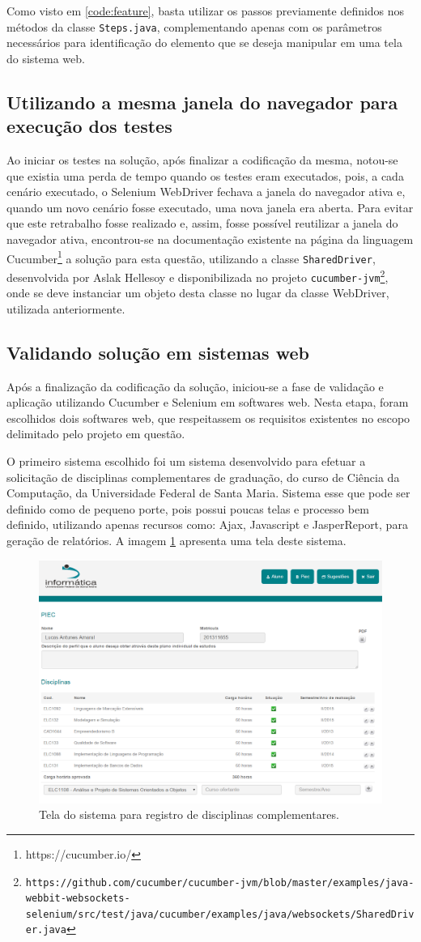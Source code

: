 \documentclass[tg]{mdtufsm}
\begin{document}
Como visto em \ref{code:feature}, basta utilizar os passos previamente definidos nos métodos da classe \texttt{Steps.java}, complementando apenas com os parâmetros necessários para identificação do elemento que se deseja manipular em uma tela do sistema web.

\subsection{Utilizando a mesma janela do navegador para execução dos testes}
Ao iniciar os testes na solução, após finalizar a codificação da mesma, notou-se que existia uma perda de tempo quando os testes eram executados, pois, a cada cenário executado, o Selenium WebDriver fechava a janela do navegador ativa e, quando um novo cenário fosse executado, uma nova janela era aberta. Para evitar que este retrabalho fosse realizado e, assim, fosse possível reutilizar a janela do navegador ativa, encontrou-se na documentação existente na página da linguagem Cucumber\footnote{https://cucumber.io/} a solução para esta questão, utilizando a classe \texttt{SharedDriver}, desenvolvida por Aslak Hellesoy e disponibilizada no projeto \texttt{cucumber-jvm\footnote{https://github.com/cucumber/cucumber-jvm/blob/master/examples/java-webbit-websockets-selenium/src/test/java/cucumber/examples/java/websockets/SharedDriver.java}}, onde se deve instanciar um objeto desta classe no lugar da classe WebDriver, utilizada anteriormente.

\subsection{Validando solução em sistemas web}
Após a finalização da codificação da solução, iniciou-se a fase de validação e aplicação utilizando Cucumber e Selenium em softwares web. Nesta etapa, foram escolhidos dois softwares web, que respeitassem os requisitos existentes no escopo delimitado pelo projeto em questão. 

O primeiro sistema escolhido foi um sistema desenvolvido para efetuar a solicitação de disciplinas complementares de graduação, do curso de Ciência da Computação, da Universidade Federal de Santa Maria. Sistema esse que pode ser definido como de pequeno porte, pois possui poucas telas e processo bem definido, utilizando apenas recursos como: Ajax, Javascript e JasperReport, para geração de relatórios. A imagem \ref{fig:piec} apresenta uma tela deste sistema.

\begin{figure}[!htb]
	\centering
	\includegraphics[width=0.5
	\textwidth]{piec}
	\caption{Tela do sistema para registro de disciplinas complementares.}
	\label{fig:piec}
\end{figure}
\end{document}
